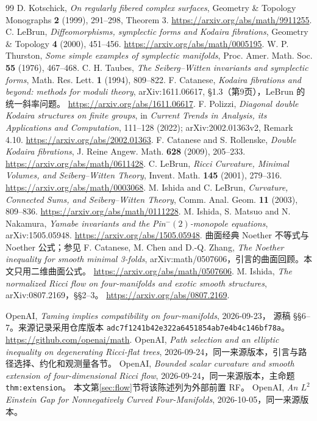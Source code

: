 \documentclass[UTF8,11pt,a4paper,fontset=none]{ctexart}
\numberwithin{equation}{section}
\theoremstyle{definition}
\theoremstyle{remark}\newtheorem{remark}[theorem]{说明}
\begin{document}
\begin{thebibliography}{99}
 D. Kotschick, \emph{On regularly fibered complex surfaces},
Geometry \& Topology Monographs \textbf{2} (1999), 291--298, Theorem 3.
\url{https://arxiv.org/abs/math/9911255}.
 C. LeBrun, \emph{Diffeomorphisms, symplectic forms and Kodaira fibrations},
Geometry \& Topology \textbf{4} (2000), 451--456.
\url{https://arxiv.org/abs/math/0005195}.
 W. P. Thurston, \emph{Some simple examples of symplectic manifolds},
Proc. Amer. Math. Soc. \textbf{55} (1976), 467--468.
 C. H. Taubes, \emph{The Seiberg--Witten invariants and symplectic forms},
Math. Res. Lett. \textbf{1} (1994), 809--822.
 F. Catanese, \emph{Kodaira fibrations and beyond: methods for moduli theory},
arXiv:1611.06617, §1.3（第9页），LeBrun 的统一斜率问题。
\url{https://arxiv.org/abs/1611.06617}.
 F. Polizzi, \emph{Diagonal double Kodaira structures on finite groups},
in \emph{Current Trends in Analysis, its Applications and Computation}, 111--128 (2022);
arXiv:2002.01363v2, Remark 4.10.
\url{https://arxiv.org/abs/2002.01363}.
 F. Catanese and S. Rollenske, \emph{Double Kodaira fibrations},
J. Reine Angew. Math. \textbf{628} (2009), 205--233.
\url{https://arxiv.org/abs/math/0611428}.
 C. LeBrun, \emph{Ricci Curvature, Minimal Volumes, and Seiberg--Witten Theory},
Invent. Math. \textbf{145} (2001), 279--316.
\url{https://arxiv.org/abs/math/0003068}.
 M. Ishida and C. LeBrun, \emph{Curvature, Connected Sums, and Seiberg--Witten Theory},
Comm. Anal. Geom. \textbf{11} (2003), 809--836.
\url{https://arxiv.org/abs/math/0111228}.
 M. Ishida, S. Matsuo and N. Nakamura,
\emph{Yamabe invariants and the Pin$^-(2)$-monopole equations}, arXiv:1505.05948.
\url{https://arxiv.org/abs/1505.05948}.
 曲面经典 Noether 不等式与 Noether 公式；参见
F. Catanese, M. Chen and D.-Q. Zhang, \emph{The Noether inequality for smooth minimal 3-folds},
arXiv:math/0507606，引言的曲面回顾。本文只用二维曲面公式。
\url{https://arxiv.org/abs/math/0507606}.
 M. Ishida, \emph{The normalized Ricci flow on four-manifolds and exotic smooth structures},
arXiv:0807.2169，§§2--3。
\url{https://arxiv.org/abs/0807.2169}.

 OpenAI, \emph{Taming implies compatibility on four-manifolds}, 2026-09-23，
源稿 §§6--7。来源记录采用仓库版本
\texttt{adc7f1241b42e322a6451854ab7e4b4c146bf78a}。
\url{https://github.com/openai/math}.
 OpenAI, \emph{Path selection and an elliptic inequality on degenerating Ricci-flat trees},
2026-09-24，同一来源版本，引言与路径选择、约化和观测量各节。
 OpenAI, \emph{Bounded scalar curvature and smooth extension of four-dimensional Ricci flow},
2026-09-24，同一来源版本，主命题 \texttt{thm:extension}。
本文第\ref{sec:flow}节将该陈述列为外部前置 RF。
 OpenAI, \emph{An $L^2$ Einstein Gap for Nonnegatively Curved Four-Manifolds},
2026-10-05，同一来源版本。
\end{thebibliography}
\end{document}
